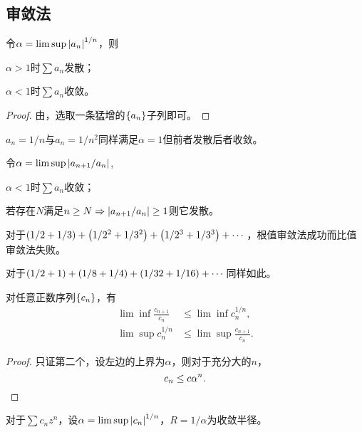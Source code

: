 \documentclass{ctexrep}
\begin{document}
  \subsection{审敛法}
  \begin{theorem}[根值审敛法]
    令$\alpha = \lim\sup \abs{a_n}^{1/n}$，则
    \begin{cenum}
      \item $\alpha > 1$时$\sum a_n$发散；
      \item $\alpha < 1$时$\sum a_n$收敛。
    \end{cenum}
  \end{theorem}
  \begin{proof}
    由，选取一条猛增的$\left\{a_n\right\}$子列即可。
  \end{proof}
  \begin{ex}
    $a_n=1/n$与$a_n=1/n^2$同样满足$\alpha=1$但前者发散后者收敛。
  \end{ex}
  \begin{theorem}[比值审敛法]
    令$\alpha=\lim\sup\abs{a_{n+1}/a_n}$,
    \begin{cenum}
      \item $\alpha < 1$时$\sum a_n$收敛；
      \item 若存在$N$满足$n\ge N\Rightarrow \abs{a_{n+1}/a_n} \ge 1$则它发散。
    \end{cenum}
  \end{theorem}
  \begin{ex}
    对于$\left(1/2+1/3\right) + \left(1/2^2+1/3^2\right) + \left(1/2^3+1/3^3\right) + \cdots$，根值审敛法成功而比值审敛法失败。
  \end{ex}
  \begin{ex}
    对于$\left(1/2+1\right)+\left(1/8+1/4\right)+\left(1/32+1/16\right)+\cdots$同样如此。
  \end{ex}
  \begin{theorem}
    对任意正数序列$\left\{c_n\right\}$，有
    \begin{align*}
      \lim\inf \frac{c_{n+1}}{c_n} &\le \lim\inf c_n^{1/n},\\
      \lim\sup c_n^{1/n} &\le \lim\sup \frac{c_{n+1}}{c_n}.
    \end{align*}
  \end{theorem}
  \begin{proof}
    只证第二个，设左边的上界为$\alpha$，则对于充分大的$n$，
    \[ c_n \le c \alpha^n. \qedhere \]
  \end{proof}
  \begin{theorem}
    对于$\sum c_n z^n$，设$\alpha=\lim\sup\abs{c_n}^{1/n}$，$R=1/\alpha$为收敛半径。
  \end{theorem}
\end{document}
